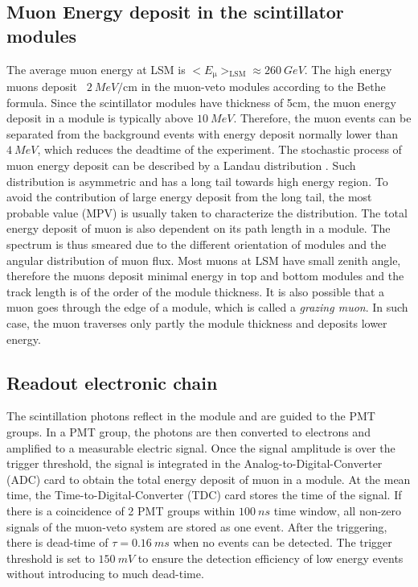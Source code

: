 \subsection{Muon Energy deposit in the scintillator modules}
The average muon energy at LSM is $<E_{\upmu}>_{\mathrm{LSM}}\approx \SI{260}{GeV}$. The high energy muons deposit ~$\SI{2}{MeV\per\cm}$ in the muon-veto modules according to the Bethe formula. Since the scintillator modules have thickness of 5cm, the muon energy deposit in a module is typically above $\SI{10}{MeV}$. Therefore, the muon events can be separated from the background events with energy deposit normally lower than $\SI{4}{MeV}$, which reduces the deadtime of the experiment.
The stochastic process of muon energy deposit can be described by a Landau distribution \cite{Lan44}. Such distribution is asymmetric and has a long tail towards high energy region. To avoid the contribution of large energy deposit from the long tail, the most probable value (MPV) is usually taken to characterize the distribution.
The total energy deposit of muon is also dependent on its path length in a module. The spectrum is thus smeared due to the different orientation of modules and the angular distribution of muon flux. Most muons at LSM have small zenith angle, therefore the muons deposit minimal energy in top and bottom modules and the track length is of the order of the module thickness.
It is also possible that a muon goes through the edge of a module, which is called a \textit{grazing muon}. In such case, the muon traverses only partly the module thickness and deposits lower energy.

\subsection{Readout electronic chain}
The scintillation photons reflect in the module and are guided to the PMT groups. In a PMT group, the photons are then converted to electrons and amplified to a measurable electric signal. Once the signal amplitude is over the trigger threshold, the signal is integrated in the Analog-to-Digital-Converter (ADC) card to obtain the total energy deposit of muon in a module. At the mean time, the Time-to-Digital-Converter (TDC) card stores the time of the signal. If there is a coincidence of 2 PMT groups within $\SI{100}{ns}$ time window, all non-zero signals of the muon-veto system are stored as one event. After the triggering, there is dead-time of $\tau=\SI{0.16}{ms}$ when no events can be detected. The trigger threshold is set to $\SI{150}{mV}$ to ensure the detection efficiency of low energy events without introducing to much dead-time.

